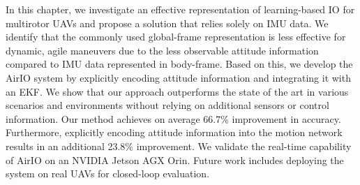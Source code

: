 In this chapter, we investigate an effective representation of learning-based IO for multirotor UAVs and propose a solution that relies solely on IMU data. We identify that the commonly used global-frame representation is less effective for dynamic, agile maneuvers due to the less observable attitude information compared to IMU data represented in body-frame.
Based on this, we develop the AirIO system by explicitly encoding attitude information and integrating it with an EKF.
We show that our approach outperforms the state of the art \cite{CioffiRal2023} in various scenarios and environments without relying on additional sensors or control information. Our method achieves on average 66.7\% improvement in accuracy. Furthermore, explicitly encoding attitude information into the motion network results in an additional 23.8\% improvement.
We validate the real-time capability of AirIO on an NVIDIA Jetson AGX Orin. Future work includes deploying the system on real UAVs for closed-loop evaluation.
